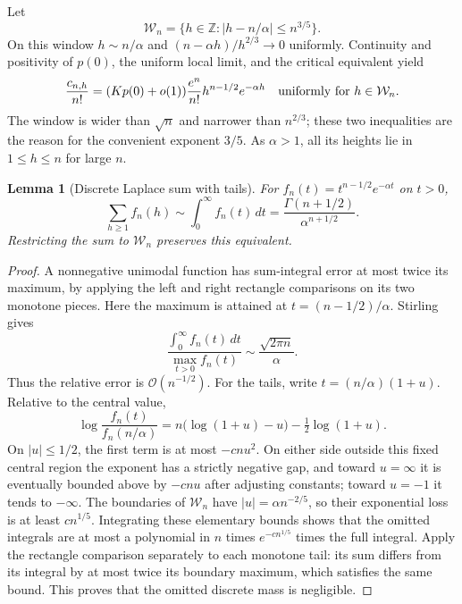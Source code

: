 \documentclass[11pt]{article}
\newtheorem{lemma}[theorem]{Lemma}
\theoremstyle{remark}\newtheorem{remark}[theorem]{Remark}
\newcommand{\OO}{\mathcal O}
\newcommand{\Z}{\mathbb Z}
\begin{document}
Let
\begin{equation}\label{xtw:airy:eq:heightwindow}
 \mathcal W_n=\{h\in\Z:|h-n/\alpha|\le n^{3/5}\}.
\end{equation}
On this window $h\sim n/\alpha$ and
$(n-\alpha h)/h^{2/3}\to0$ uniformly. Continuity and positivity of $p(0)$,
the uniform local limit, and the critical equivalent yield
\begin{equation}\label{xtw:airy:eq:centralcoeff}
 \frac{c_{n,h}}{n!}
 =(Kp(0)+o(1))\frac{e^n}{n!}h^{n-1/2}e^{-\alpha h}
 \quad\hbox{uniformly for }h\in\mathcal W_n.
\end{equation}
The window is wider than $\sqrt n$ and narrower than $n^{2/3}$; these two
inequalities are the reason for the convenient exponent $3/5$.
As $\alpha>1$, all its heights lie in $1\le h\le n$ for large $n$.

\begin{lemma}[Discrete Laplace sum with tails]\label{xtw:airy:lem:laplace}
For $f_n(t)=t^{n-1/2}e^{-\alpha t}$ on $t>0$,
\begin{equation}\label{xtw:airy:eq:laplace}
 \sum_{h\ge1}f_n(h)\sim\int_0^\infty f_n(t)\,dt
 =\frac{\Gamma(n+1/2)}{\alpha^{n+1/2}}.
\end{equation}
Restricting the sum to $\mathcal W_n$ preserves this equivalent.
\end{lemma}
\begin{proof}
A nonnegative unimodal function has sum-integral error at most twice its
maximum, by applying the left and right rectangle comparisons on its two
monotone pieces. Here the maximum is attained at
$t=(n-1/2)/\alpha$. Stirling gives
\[
 \frac{\int_0^\infty f_n(t)\,dt}{\max_{t>0}f_n(t)}
 \sim\frac{\sqrt{2\pi n}}\alpha.
\]
Thus the relative error is $\OO(n^{-1/2})$.
For the tails, write $t=(n/\alpha)(1+u)$. Relative to the central value,
\begin{equation}\label{xtw:airy:eq:laplaceexponent}
 \log\frac{f_n(t)}{f_n(n/\alpha)}
 =n\bigl(\log(1+u)-u\bigr)-\tfrac12\log(1+u).
\end{equation}
On $|u|\le1/2$, the first term is at most $-cnu^2$.
On either side outside this fixed central region the exponent has a
strictly negative gap, and toward $u=\infty$ it is eventually bounded above
by $-cnu$ after adjusting constants; toward $u=-1$ it tends to $-\infty$.
The boundaries of $\mathcal W_n$ have $|u|=\alpha n^{-2/5}$, so their
exponential loss is at least $c n^{1/5}$. Integrating these elementary
bounds shows that the omitted integrals are at most a polynomial in $n$
times $e^{-cn^{1/5}}$ times the full integral. Apply the rectangle
comparison separately to each monotone tail: its sum differs from its
integral by at most twice its boundary maximum, which satisfies the same
bound. This proves that the omitted discrete mass is negligible.
\end{proof}
\end{document}

